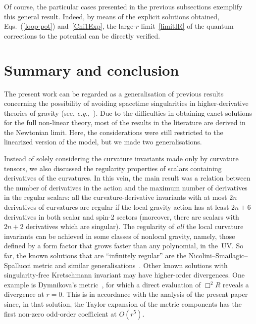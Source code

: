 \documentclass[aps,prd,a4paper,twocolumn,showpacs,showkeys,preprintnumbers,amsmath,amssymb,nofootinbib]{revtex4-2}
\renewcommand{\thesection}{\arabic{section}}
\numberwithin{equation}{section}
\let\oldsection\section%
\renewcommand{\section}{%
  \renewcommand{\theequation}{\thesection.\arabic{equation}}%
  \oldsection}%
\newcommand{\eq}[1]{(\ref{#1})}
\begin{document}
Of course, the particular cases presented in the previous subsections exemplify this general result. Indeed, by means of the explicit solutions obtained, Eqs.~\eq{loop-pot} and~\eqref{Chi1Exp}, the large-$r$ limit~\eqref{limitIR} of the quantum corrections to the potential can be directly verified.



\section{Summary and conclusion}
\label{Sec7}

The present work can be regarded as a generalisation of previous results concerning the possibility of avoiding spacetime singularities in higher-derivative theories of gravity (see, \textit{e.g.},~\cite{BreTib1,BreTib2,Newton-MNS,Newton-BLG,Frolov:Poly,Frolov:Exp,Head-On,Edholm:2016hbt,Accioly:2016qeb,Zhang14,Modesto-LWBH}). Due to the difficulties in obtaining exact solutions for the full non-linear theory, most of the results in the literature are derived in the Newtonian limit. Here, the considerations were still restricted to the linearized version of the model, but we made two generalisations.

Instead of solely considering the curvature invariants made only by curvature tensors, we also discussed the regularity properties of scalars containing derivatives of the curvatures. In this vein, the main result was
a relation between the number of derivatives in the action and the maximum number of derivatives in the regular scalars: 
 all the curvature-derivative invariants with at most $2n$ derivatives of curvatures are regular if the local gravity action has at least $2n+6$ derivatives in both scalar and spin-2 sectors (moreover, there are scalars with $2n+2$ derivatives which are singular). The regularity of \textit{all} the local curvature invariants can be achieved in some classes of nonlocal gravity, namely, those defined by a form factor that grows faster than any polynomial, in the~UV.
So far, the known solutions that are ``infinitely regular'' are the Nicolini--Smailagic--Spallucci metric 
\cite{Nicolini:2008aj, Nicolini:2005vd} and similar generalisations~\cite{Zhang14}.
Other known solutions with singularity-free Kretschmann invariant may have higher-order divergences. One example is  Dymnikova's metric~\cite{Dymnikova:1992ux}, for which a direct evaluation of $\Box^2 R$ reveals a divergence at $r = 0$. This is in accordance
with the analysis of the present paper since, in that solution, the Taylor expansion of the metric components has the first non-zero odd-order coefficient at $O(r^5)$.
\end{document}
